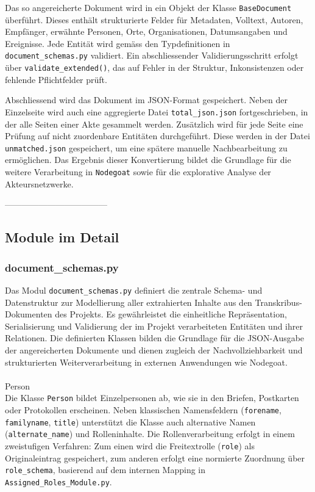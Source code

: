 \documentclass[12pt, a4paper, ngerman, bidi=default]{article}
\makeatletter
\newcommand{\code}[1]{\colorbox{VeryLightGray}{\texttt{#1}}} %
\let\oldparagraph\paragraph%
\renewcommand{\paragraph}{
    \@ifstar%
      \xxxParagraphStar%
      \xxxParagraphNoStar%
 }
\newcommand{\xxxParagraphStar}[1]{\oldparagraph*{#1}\mbox{}}
\newcommand{\xxxParagraphNoStar}[1]{\oldparagraph{#1}\mbox{}}
\makeatother
\begin{document}
Das so angereicherte Dokument wird in ein Objekt der Klasse \code{BaseDocument} überführt. Dieses enthält strukturierte Felder für 
Metadaten, Volltext, Autoren, Empfänger, erwähnte Personen, Orte, Organisationen, Datumsangaben und Ereignisse. Jede Entität wird gemäss 
den Typdefinitionen in \code{document\_schemas.py} validiert. Ein abschliessender Validierungsschritt erfolgt über 
\code{validate\_extended()}, das auf Fehler in der Struktur, Inkonsistenzen oder fehlende Pflichtfelder prüft.

Abschliessend wird das Dokument im JSON-Format gespeichert. Neben der Einzelseite wird auch eine aggregierte Datei 
\code{total\_json.json} fortgeschrieben, in der alle Seiten einer Akte gesammelt werden. Zusätzlich wird für jede Seite 
eine Prüfung auf nicht zuordenbare Entitäten durchgeführt. Diese werden in der Datei \code{unmatched.json} gespeichert, 
um eine spätere manuelle Nachbearbeitung zu ermöglichen. Das Ergebnis dieser Konvertierung bildet die Grundlage für die weitere 
Verarbeitung in \code{Nodegoat} sowie für die explorative Analyse der Akteursnetzwerke.

------------------------------------


\subsection{Module im Detail}\label{subsec:Module_im_Detail}
\subsubsection{document\_schemas.py}\label{subsec:document_schema}
Das Modul \code{document\_schemas.py} definiert die zentrale Schema- und Datenstruktur 
zur Modellierung aller extrahierten Inhalte aus den Transkribus-Dokumenten des Projekts. Es gewährleistet die einheitliche Repräsentation, 
Serialisierung und Validierung der im Projekt verarbeiteten Entitäten und ihrer Relationen. Die definierten Klassen bilden die Grundlage für die JSON-Ausgabe der angereicherten Dokumente und dienen zugleich der Nachvollziehbarkeit und strukturierten Weiterverarbeitung in externen Anwendungen wie Nodegoat.

\paragraph{Person}\\
Die Klasse \code{Person} bildet Einzelpersonen ab, wie sie in den Briefen, Postkarten oder Protokollen erscheinen. 
Neben klassischen Namensfeldern (\code{forename}, \code{familyname}, \code{title}) unterstützt die Klasse auch 
alternative Namen (\code{alternate\_name}) und Rolleninhalte. Die Rollenverarbeitung erfolgt in einem zweistufigen Verfahren:
Zum einen wird die Freitextrolle (\code{role}) als Originaleintrag gespeichert, zum anderen erfolgt eine normierte 
Zuordnung über \code{role\_schema}, basierend auf dem internen Mapping in \code{Assigned\_Roles\_Module.py}. 
\end{document}
